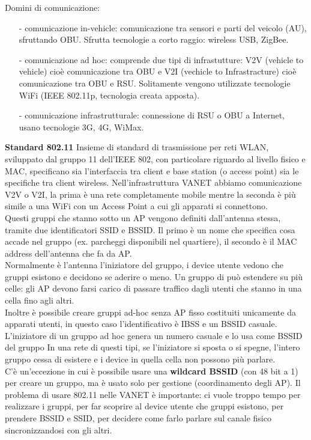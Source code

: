 \documentclass[12pt,italian]{report}
\begin{document}
\noindent Domini di comunicazione:
\begin{itemize}
    \item[-] comunicazione in-vehicle: comunicazione tra sensori e parti del veicolo (AU), sfruttando OBU. Sfrutta tecnologie a corto raggio: wireless USB, ZigBee. 
    \item [-] comunicazione ad hoc: comprende due tipi di infrastutture: V2V (vehicle to vehicle) cioè comunicazione tra OBU e V2I (vechicle to Infrastracture) cioè comunicazione tra OBU e RSU. Solitamente vengono utilizzate tecnologie WiFi (IEEE 802.11p, tecnologia creata apposta).
    \item [-] comunicazione infrastrutturale: connessione di RSU o OBU a Internet, usano tecnologie 3G, 4G, WiMax. 
\end{itemize}

\noindent \textbf{Standard 802.11} 
\bigbreak
\noindent Insieme di standard di trasmissione per reti WLAN, sviluppato dal gruppo 11 dell'IEEE 802, con particolare riguardo al livello fisico e MAC, specificano sia l'interfaccia tra client e base station (o access point) sia le specifiche tra client wireless. 
\bigbreak
Nell'infrastruttura VANET abbiamo comunicazione V2V o V2I, la prima è una rete completamente mobile mentre la seconda è più simile a una WiFi con un Access Point a cui gli apparati si connettono. \\ Questi gruppi che stanno sotto un AP vengono definiti dall'antenna stessa, tramite due identificatori SSID e BSSID. Il primo è un nome che specifica cosa accade nel gruppo (ex. parcheggi disponibili nel quartiere), il secondo è il MAC address dell'antenna che fa da AP. \\ Normalmente è l'antenna l'iniziatore del gruppo, i device utente vedono che gruppi esistono e decidono se aderire o meno. 
\bigbreak
Un gruppo di può estendere su più celle: gli AP devono farsi carico di passare traffico dagli utenti che stanno in una cella fino agli altri. \\ Inoltre è possibile creare gruppi ad-hoc senza AP fisso costituiti unicamente da apparati utenti, in questo caso l'identificativo è IBSS e un BSSID casuale. L'iniziatore di un gruppo ad hoc genera un numero casuale e lo usa come BSSID del gruppo
\bigbreak
In una rete di questi tipi, se l'iniziatore si sposta o si spegne, l'intero gruppo cessa di esistere e i device in quella cella non possono più parlare. \\ C'è un'eccezione in cui è possibile usare una \textbf{wildcard BSSID} (con 48 bit a 1) per creare un gruppo, ma è usato solo per gestione (coordinamento degli AP).
\bigbreak
Il problema di usare 802.11 nelle VANET è importante: ci vuole troppo tempo per realizzare i gruppi, per far scoprire al device utente che gruppi esistono, per prendere BSSID e SSID, per decidere come farlo parlare sul canale fisico sincronizzandosi con gli altri. 
\end{document}

